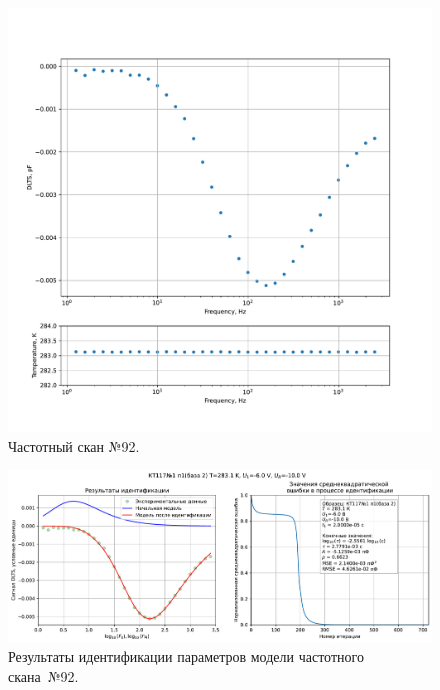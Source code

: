 \begin{figure}[!ht]
    \centering
    \includegraphics[width=1\textwidth]{../plots/КТ117№1_п1(база 2)_2500Гц-1Гц_1пФ_+10С_-6В-10В_100мВ_20мкс_шаг_0,1.pdf}
    \caption{Частотный скан №92.}
    \label{pic:frequency_scan_92}
\end{figure}

\begin{figure}[!ht]
    \centering
    \includegraphics[width=1\textwidth]{../plots/КТ117№1_п1(база 2)_2500Гц-1Гц_1пФ_+10С_-6В-10В_100мВ_20мкс_шаг_0,1_model.pdf}
    \caption{Результаты идентификации параметров модели частотного скана~№92.}
    \label{pic:frequency_scan_model92}
\end{figure}

\pagebreak


